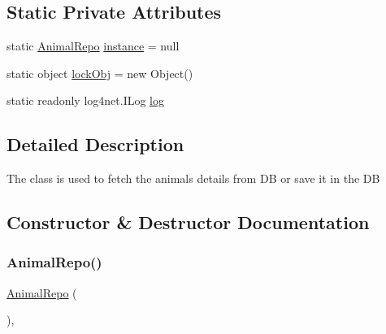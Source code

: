 \subsection*{Static Private Attributes}
\begin{DoxyCompactItemize}
\item 
static \hyperlink{classWildLifeTracker_1_1Repository_1_1AnimalRepo}{Animal\+Repo} \hyperlink{classWildLifeTracker_1_1Repository_1_1AnimalRepo_a2c0ef2ce85fcac623e1483de4af6be26}{instance} = null
\item 
static object \hyperlink{classWildLifeTracker_1_1Repository_1_1AnimalRepo_a38ff5bc3c19841e1e23deb0481c9816c}{lock\+Obj} = new Object()
\item 
static readonly log4net.\+I\+Log \hyperlink{classWildLifeTracker_1_1Repository_1_1AnimalRepo_ae6c6142b8525b2f4ac6ee6e003b3106f}{log}
\end{DoxyCompactItemize}


\subsection{Detailed Description}
The class is used to fetch the animals details from DB or save it in the DB 



\subsection{Constructor \& Destructor Documentation}
\mbox{\label{classWildLifeTracker_1_1Repository_1_1AnimalRepo_a87ae250b13d1507332ef5eaade93de91}} 
\subsubsection{\texorpdfstring{Animal\+Repo()}{AnimalRepo()}}
{\footnotesize\ttfamily \hyperlink{classWildLifeTracker_1_1Repository_1_1AnimalRepo}{Animal\+Repo} (\begin{DoxyParamCaption}{ }\end{DoxyParamCaption})\hspace{0.3cm}{\ttfamily [inline]}, {\ttfamily [private]}}



